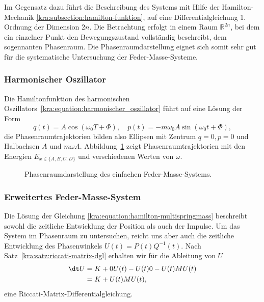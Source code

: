 Im Gegensatz dazu führt die Beschreibung des Systems mit Hilfe der
Hamilton-Mechanik \ref{kra:subsection:hamilton-funktion}, auf eine
Differentialgleichung 1. Ordnung der Dimension $2n$.
Die Betrachtung erfolgt in einem Raum $\mathbb{R}^{2n}$, bei dem
ein einzelner Punkt den Bewegungszustand vollständig beschreibt,
dem sogennanten Phasenraum.
Die Phasenraumdarstellung eignet sich somit sehr gut für die
systematische Untersuchung der Feder-Masse-Systeme.

\subsubsection{Harmonischer Oszillator}
%
Die Hamiltonfunktion des harmonischen
Oszillators~\eqref{kra:equation:harmonischer_oszillator}
führt auf eine Lösung der Form
\begin{equation*}
    q(t) = A \cos(\omega_0 T + \Phi), \quad p(t) = -m \omega_0 A \sin(\omega_0 t + \Phi),
\end{equation*}
die Phasenraumtrajektorien bilden also Ellipsen mit Zentrum $q=0,
p=0$ und Halbachsen $A$ und $m \omega A$.
%
Abbildung~\ref{kra:fig:phasenraum} zeigt Phasenraumtrajektorien
mit den Energien $E_{x \in \{A, B, C, D\}}$ und verschiedenen Werten von
$\omega$.
\begin{figure}
    \centering
    
    \caption{Phasenraumdarstellung des einfachen Feder-Masse-Systems.}
    \label{kra:fig:phasenraum}
\end{figure}

\subsubsection{Erweitertes Feder-Masse-System}
Die Lösung der Gleichung \eqref{kra:equation:hamilton-multispringmass}
beschreibt sowohl die zeitliche Entwicklung der Position als auch
der Impulse.
Um das System im Phasenraum zu untersuchen, reicht uns aber auch
die zeitliche Entwicklung des Phasenwinkels $U(t) = P(t)Q^{-1}(t)$.
Nach Satz~\ref{kra:satz:riccati-matrix-dgl} erhalten wir für die
Ableitung von $U$
\begin{equation}
    \begin{split}
        \dt U   &= K  + 0U(t) - U(t)0 - U(t)MU(t) \\
        &= K + U(t)MU(t),
    \end{split}
\end{equation}
eine Riccati-Matrix-Differentialgleichung.

